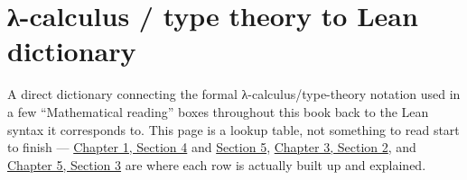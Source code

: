 \chapter*{λ-calculus / type theory to Lean dictionary}
\setcounter{section}{0}\label{sec:root:lambda-calculus-dictionary:1}

A direct dictionary connecting the formal λ-calculus/type-theory notation used in a few ``Mathematical reading'' boxes throughout this book back to the Lean syntax it corresponds to. This page is a lookup table, not something to read start to finish --- \hyperref[sec:01-basics:04-terminology:1]{Chapter 1, Section 4} and \hyperref[sec:01-basics:05-pi-sigma-and-coc:1]{Section 5}, \hyperref[sec:03-propositions-and-proofs:02-logic-recap:1]{Chapter 3, Section 2}, and \hyperref[sec:05-rigor-check:03-typing-rules-and-safety:1]{Chapter 5, Section 3} are where each row is actually built up and explained.

